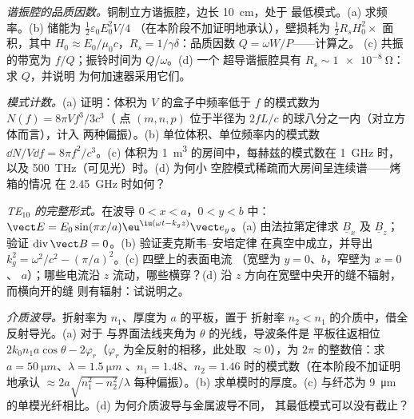 \begin{exercise}[$\star\star$]\label{exo:b2:guided-waves:8}
\emph{谐振腔的品质因数。}铜制立方谐振腔，边长 \qty{10}{cm}，处于
最低模式。(a) 求频率。(b) 储能为 $\tfrac12\varepsilon_0E_0^2V/4$
（在本阶段不加证明地承认），壁损耗为 $\tfrac12R_sH_0^2\times$ 面积，其中 $H_0 \approx E_0/
\mu_0c$，$R_s = 1/\gamma\delta$：品质因数 $Q = \omega W/P$——计算之。
(c) 共振的带宽为 $f/Q$；振铃时间为 $Q/\omega$。(d) 一个
超导谐振腔具有 $R_s \sim \qty{1e-8}{\ohm}$：求 $Q$，并说明
为何加速器采用它们。
\end{exercise}

\begin{exercise}[$\star\star$]\label{exo:b2:guided-waves:9}
\emph{模式计数。}(a) 证明：体积为
$V$ 的盒子中频率低于 $f$ 的模式数为 $N(f) = 8\pi Vf^3/3c^3$（
点 $(m, n, p)$ 位于半径为 $2fL/c$ 的球八分之一内（对立方体而言），计入
两种偏振）。(b) 单位体积、单位频率内的模式数
$\dd N/V\dd f = 8\pi f^2/c^3$。(c) 体积为 \qty{1}{m^3} 的房间中，每赫兹的模式数在
\qty{1}{GHz} 时，以及 \qty{500}{THz}（可见光）时。(d) 为何小
空腔模式稀疏而大房间呈连续谱——烤箱的情况
在 \qty{2.45}{GHz} 时如何？
\end{exercise}

\begin{exercise}[$\star\star\star$]\label{exo:b2:guided-waves:10}
\emph{TE$_{10}$ 的完整形式。}在波导 $0 < x < a$，$0 < y < b$ 中：$\vect E =
E_0\sin(\pi x/a)\eu^{\iu(\omega t - k_gz)}\vect e_y$。(a) 由法拉第定律求 $\underline B_x$
及 $\underline B_z$；验证 $\operatorname{div}\vect B = 0$。(b) 验证麦克斯韦–安培定律
在真空中成立，并导出 $k_g^2 = \omega^2/c^2 - (\pi/a)^2$。(c) 四壁上的表面电流
（宽壁为 $y = 0$、$b$，窄壁为 $x = 0$、
$a$）；哪些电流沿 $z$ 流动，哪些横穿？(d) 沿
$z$ 方向在宽壁中央开的缝不辐射，而横向开的缝
则有辐射：试说明之。
\end{exercise}

\begin{exercise}[$\star\star\star$]\label{exo:b2:guided-waves:11}
\emph{介质波导。}折射率为 $n_1$、厚度为 $a$ 的平板，置于
折射率 $n_2 < n_1$ 的介质中，借全反射导光。(a) 对于
与界面法线夹角为 $\theta$ 的光线，导波条件是
平板往返相位 $2k_0n_1a\cos\theta - 2\varphi_r$（$\varphi_r$
为全反射的相移，此处取 $\approx 0$），为
$2\pi$ 的整数倍：求 $a = \qty{50}{\micro m}$、$\lambda = \qty{1.5}{\micro m}$
、$n_1 = 1.48$、$n_2 = 1.46$ 时的模式数（在本阶段不加证明地承认
$\approx 2a\sqrt{n_1^2 - n_2^2}/\lambda$ 每种偏振）。(b) 求单模时的厚度。(c) 与纤芯为
\qty{9}{\micro m} 的单模光纤相比。(d) 为何介质波导与金属波导不同，
其最低模式可以没有截止？
\end{exercise}

